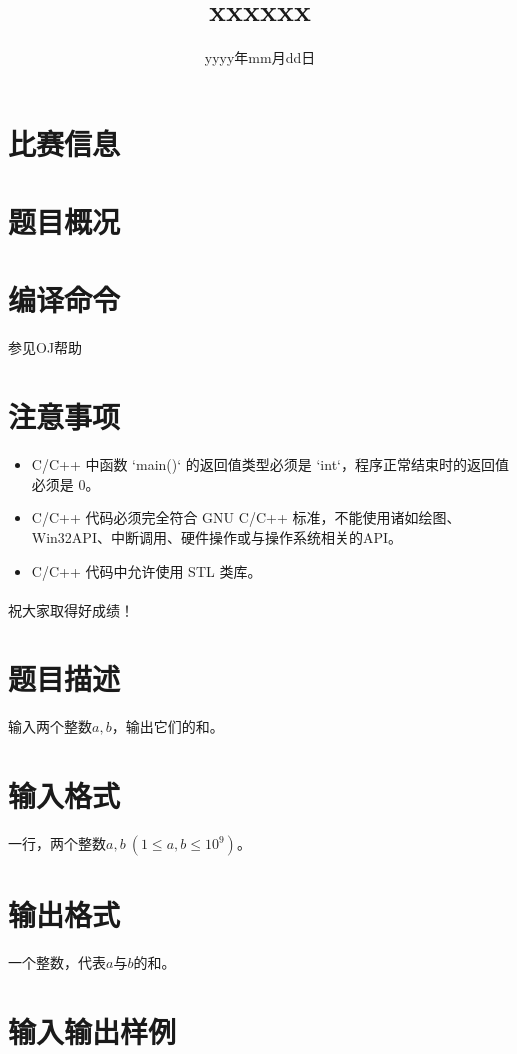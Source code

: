 \documentclass{ctpro}
\title{xxxxxx}
\date{yyyy年mm月dd日}
\begin{document}

\maketitle
{}

\section*{比赛信息}

\section*{题目概况}
\problemtab

\section*{编译命令}
参见OJ帮助

\section*{注意事项}
\begin{itemize}
	\item C/C++ 中函数 `main()` 的返回值类型必须是 `int`，程序正常结束时的返回值必须是 0。
	\item C/C++ 代码必须完全符合 GNU C/C++ 标准，不能使用诸如绘图、Win32API、中断调用、硬件操作或与操作系统相关的API。
	\item C/C++ 代码中允许使用 STL 类库。
\end{itemize}

\paragraph*{} 祝大家取得好成绩！

\makeproblem
\section*{题目描述}
输入两个整数$a,b$，输出它们的和。

\section*{输入格式}
一行，两个整数$a,b~(1 \leq a,b \leq 10^9)$。

\section*{输出格式}
一个整数，代表$a$与$b$的和。

\section*{输入输出样例}
\end{document}
